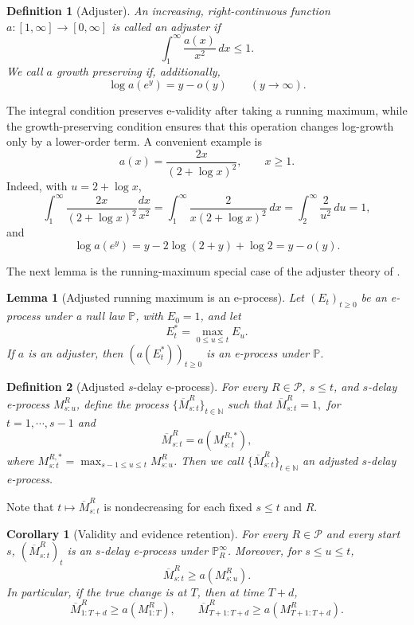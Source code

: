 \documentclass[12pt]{article}
\theoremstyle{spaced}
\newtheorem{lemma}[lemma]{Lemma}
\newtheorem{corollary}[corollary]{Corollary}
\newtheorem{definition}[definition]{Definition}
\theoremstyle{remark}
\newcommand{\N}{\mathbb N}
\newcommand{\calP}{\mathcal P}
\newcommand{\Pinf}[1]{\mathbb P_{#1}^{\infty}}
\begin{document}
\begin{definition}[Adjuster]
\label{def:adjuster}
An increasing, right-continuous function $a:[1,\infty]\to[0,\infty]$ is called an adjuster if
\[
  \int_1^{\infty} \frac{a(x)}{x^2}\,dx\le 1.
\]
We call $a$ growth preserving if, additionally,
\[
  \log a(e^y)=y-o(y)\qquad (y\to\infty).
\]
\end{definition}
The integral condition preserves e-validity after taking a running
maximum, while the growth-preserving condition ensures that this
operation changes log-growth only by a lower-order term.
A convenient example is
\begin{equation}\label{eq:canonical-adjuster}
  a(x)=\frac{2x}{(2+\log x)^2},\qquad x\ge 1.
\end{equation}
Indeed, with $u=2+\log x$,
\[
  \int_1^\infty \frac{2x}{(2+\log x)^2}\frac{dx}{x^2}
  =\int_1^\infty \frac{2}{x(2+\log x)^2}\,dx
  =\int_2^\infty \frac{2}{u^2}\,du=1,
\]
and
\[
  \log a(e^y)=y-2\log(2+y)+\log 2=y-o(y).
\]

The next lemma is the running-maximum special case of the adjuster theory of  \cite{choe2026combining}.  

\begin{lemma}[Adjusted running maximum is an e-process]\label{lem:adjusted-max}
Let $(E_t)_{t\ge0}$ be an e-process under a null law $\mathbb P$, with $E_0=1$, and let
\[
  E_t^*=\max_{0\le u\le t}E_u.
\]
If $a$ is an adjuster, then $(a(E_t^*))_{t\ge0}$ is an e-process under $\mathbb P$.
\end{lemma}



\begin{definition}[Adjusted $s$-delay e-process]\label{def:adjusted-block}
For every $R\in\calP$, $s\le t$, and $s$-delay e-process $M_{s:u}^R$, define the process $ \{\overline M_{s:t}^R\}_{t\in\N}$ such that $ \overline M_{s:t}^R=1,$ for $t=1,\cdots,s-1$ and
\[
  \overline M_{s:t}^R=a(M_{s:t}^{R,*}),
\]
where $M_{s:t}^{R,*}=\max_{s-1\le u\le t}M_{s:u}^R$. Then we call $ \{\overline M_{s:t}^R\}_{t\in\N}$ an adjusted $s$-delay e-process.
\end{definition}
Note that $t\mapsto \overline M_{s:t}^R$ is nondecreasing for each fixed $s\leq t$ and $R$.
\begin{corollary}[Validity and evidence retention]\label{cor:valid-retention}
For every $R\in\calP$ and every start $s$, $(\overline M_{s:t}^R)_{t}$ is an $s$-delay e-process under $\Pinf{R}$.  Moreover, for $s\le u\le t$,
\[
  \overline M_{s:t}^R\ge a(M_{s:u}^R).
\]
In particular, if the true change is at $T$, then at time $T+d$,
\begin{equation}
\label{eq:adj}
     \overline M_{1:T+d}^R\ge a(M_{1:T}^R),
  \qquad
  \overline M_{T+1:T+d}^R\ge a(M_{T+1:T+d}^R).
\end{equation}
\end{corollary}
\end{document}

